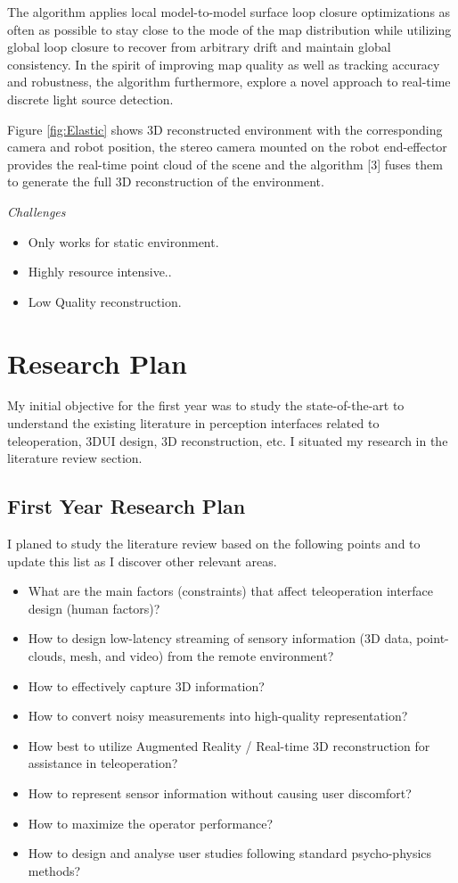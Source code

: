 The algorithm applies local model-to-model surface loop closure optimizations as often as possible to stay close to the mode of the map distribution while utilizing global loop closure to recover from arbitrary drift and maintain global consistency. In the spirit of improving map quality as well as tracking accuracy and robustness, the algorithm furthermore, explore a novel approach to real-time discrete light source detection.

Figure \ref{fig:Elastic} shows 3D reconstructed environment with the corresponding camera and robot position, the stereo camera mounted on the robot end-effector provides the real-time point cloud of the scene and   the algorithm [3] fuses them to generate the full 3D reconstruction of the environment.

\textit{Challenges}
\begin{itemize}
    \item Only works for static environment.
    \item Highly resource intensive..
    \item Low Quality reconstruction.
\end{itemize}

\section{Research Plan}

My initial objective for the first year was to study the state-of-the-art to understand the existing literature in perception interfaces related to teleoperation, 3DUI design, 3D reconstruction, etc. I situated my research in the literature review section. 

\subsection*{First Year Research Plan}

I planed to study the literature review based on the following points and to update this list as I discover other relevant areas.

\begin{itemize}
    \item What are the main factors (constraints) that affect teleoperation interface design (human factors)?
    \item How to design low-latency streaming of sensory information (3D data, point-clouds, mesh, and video) from the remote environment?
    \item How to effectively capture 3D information?
    \item How to convert noisy measurements into high-quality representation?
    \item How best to utilize Augmented Reality / Real-time 3D reconstruction for assistance in teleoperation?
    \item How to represent sensor information without causing user discomfort?
    \item How to maximize the operator performance?
    \item How to design and analyse user studies following standard psycho-physics methods?
\end{itemize}

